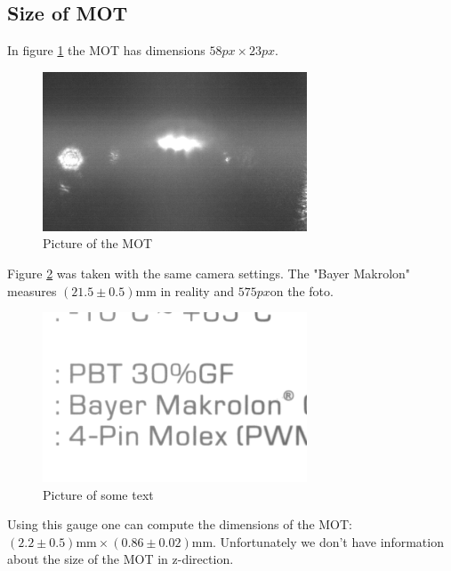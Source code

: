 \subsection{Size of MOT}
In figure \ref{fig:mot} the MOT has dimensions $58\si{px} \times 23\si{px}$. 

\begin{figure}
\centering
\includegraphics[width=0.7\textwidth]{figures/P102018/mot_2.png}
\caption{Picture of the MOT}
\label{fig:mot}
\end{figure}

Figure \ref{fig:karton} was taken with the same camera settings. The "Bayer Makrolon" measures $\si{(21.5 \pm 0.5) \milli\meter}$ in reality and $575 \si{px}$on the foto.

\begin{figure}
\centering
\includegraphics[width=0.7\textwidth]{figures/P102018/karton.png}
\caption{Picture of some text}
\label{fig:karton}
\end{figure}

Using this gauge one can compute the dimensions of the MOT: $\si{(2.2 \pm 0.5) \milli\meter \times (0.86 \pm 0.02) \milli\meter}$. Unfortunately we don't have information about the size of the MOT in z-direction.

